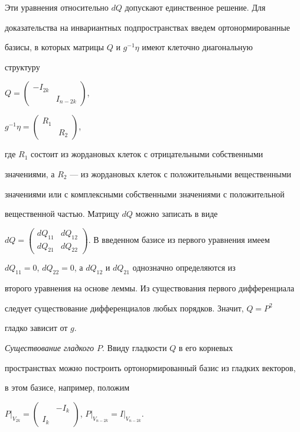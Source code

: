 Эти уравнения относительно $dQ$ допускают единственное решение. Для 


доказательства на инвариантных подпространствах введем ортонормированные


базисы, в которых матрицы $Q$ и $g^{-1}\eta$ имеют клеточно диагональную 


структуру


$Q=\left(\begin{smallmatrix}-I_{2k}&\\&I_{n-2k}\end{smallmatrix}\right)$,


$g^{-1}\eta=\left(\begin{smallmatrix}R_1&\\&R_2\end{smallmatrix}\right)$,


где $R_1$ состоит из жордановых клеток с отрицательными собственными 


значениями, а $R_2$ --- из жордановых клеток с положительными вещественными 


значениями или с комплексными собственными значениями с положительной 


вещественной частью. Матрицу $dQ$ можно записать в виде


$dQ=\left(\begin{smallmatrix}dQ_{11}&dQ_{12}\\dQ_{21}&dQ_{22}


\end{smallmatrix}\right)$. В введенном базисе из первого уравнения имеем


$dQ_{11}=0$, $dQ_{22}=0$, а $dQ_{12}$ и $dQ_{21}$ однозначно определяются из


второго уравнения на основе леммы. Из существования первого дифференциала 


следует существование дифференциалов любых порядков. Значит, $Q=P^2$


гладко зависит от $g$.





{\it Существование гладкого $P$}. Ввиду гладкости $Q$ в его корневых 


пространствах можно построить ортонормированный базис из гладких векторов, 


в этом базисе, например, положим


$P\big|_{V_{2k}}=\left(\begin{smallmatrix}&-I_k\\


I_k&\end{smallmatrix}\right)$, $P\big|_{V_{n-2k}}=I\big|_{V_{n-2k}}$.


